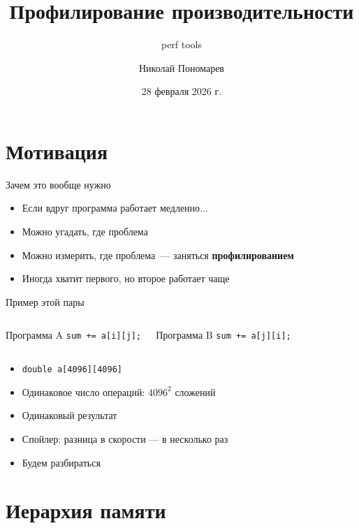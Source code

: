 \documentclass[aspectratio=169, russian]{beamer}
\title{Профилирование производительности}
\subtitle{perf tools}
\author{Николай Пономарев}
\date{28 февраля 2026 г.}
\begin{document}
\begin{frame}
    \titlepage
\end{frame}

\section{Мотивация}

\begin{frame}{Зачем это вообще нужно}
    \begin{itemize}
        \item Если вдруг программа работает медленно...
        \item Можно угадать, где проблема
        \item Можно измерить, где проблема~--- заняться \textbf{профилированием}
        \item Иногда хватит первого, но второе работает чаще
    \end{itemize}
\end{frame}

\begin{frame}{Пример этой пары}
    \begin{columns}
        \begin{block}{Программа A}
            \texttt{sum += a[\alert{i}][\alert{j}];}
        \end{block}
        \begin{block}{Программа B}
            \texttt{sum += a[\alert{j}][\alert{i}];}
        \end{block}
    \end{columns}

    \bigskip
    \begin{itemize}
        \item \texttt{double a[4096][4096]}
        \item Одинаковое число операций: $4096^2$ сложений
        \item Одинаковый результат
        \item Спойлер: разница в скорости --- в несколько раз
        \item Будем разбираться
    \end{itemize}
\end{frame}

\section{Иерархия памяти}
\end{document}
